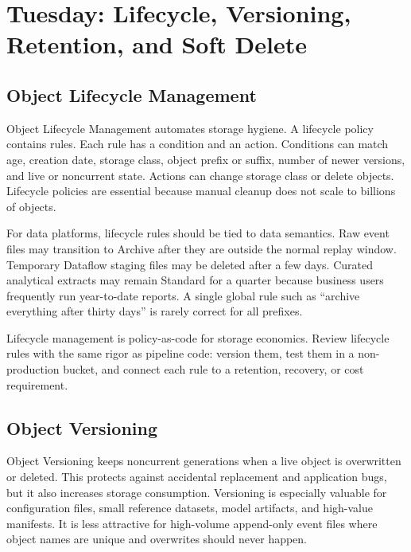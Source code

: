 \section{Tuesday: Lifecycle, Versioning, Retention, and Soft Delete}

\subsection{Object Lifecycle Management}
Object Lifecycle Management automates storage hygiene. A lifecycle policy contains rules. Each rule has a condition and an action. Conditions can match age, creation date, storage class, object prefix or suffix, number of newer versions, and live or noncurrent state. Actions can change storage class or delete objects. Lifecycle policies are essential because manual cleanup does not scale to billions of objects.

For data platforms, lifecycle rules should be tied to data semantics. Raw event files may transition to Archive after they are outside the normal replay window. Temporary Dataflow staging files may be deleted after a few days. Curated analytical extracts may remain Standard for a quarter because business users frequently run year-to-date reports. A single global rule such as ``archive everything after thirty days'' is rarely correct for all prefixes.

\begin{notebox}
Lifecycle management is policy-as-code for storage economics. Review lifecycle rules with the same rigor as pipeline code: version them, test them in a non-production bucket, and connect each rule to a retention, recovery, or cost requirement.
\end{notebox}

\subsection{Object Versioning}
Object Versioning keeps noncurrent generations when a live object is overwritten or deleted. This protects against accidental replacement and application bugs, but it also increases storage consumption. Versioning is especially valuable for configuration files, small reference datasets, model artifacts, and high-value manifests. It is less attractive for high-volume append-only event files where object names are unique and overwrites should never happen.

